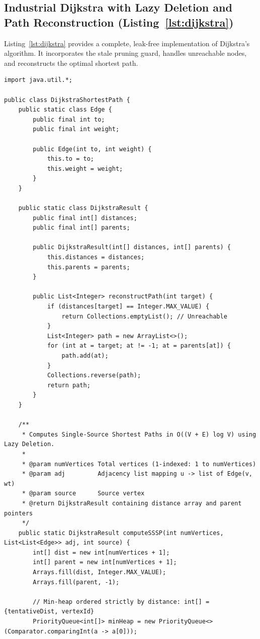 \documentclass[10pt,journal,compsoc,onecolumn]{IEEEtran}
\begin{document}
\subsection{Industrial Dijkstra with Lazy Deletion and Path Reconstruction (Listing~\ref{lst:dijkstra})}
Listing~\ref{lst:dijkstra} provides a complete, leak-free implementation of Dijkstra's algorithm. It incorporates the stale pruning guard, handles unreachable nodes, and reconstructs the optimal shortest path.

\begin{lstlisting}[caption={Production Dijkstra with Lazy Deletion and Path Reconstruction}, label={lst:dijkstra}]
import java.util.*;

public class DijkstraShortestPath {
    public static class Edge {
        public final int to;
        public final int weight;

        public Edge(int to, int weight) {
            this.to = to;
            this.weight = weight;
        }
    }

    public static class DijkstraResult {
        public final int[] distances;
        public final int[] parents;

        public DijkstraResult(int[] distances, int[] parents) {
            this.distances = distances;
            this.parents = parents;
        }

        public List<Integer> reconstructPath(int target) {
            if (distances[target] == Integer.MAX_VALUE) {
                return Collections.emptyList(); // Unreachable
            }
            List<Integer> path = new ArrayList<>();
            for (int at = target; at != -1; at = parents[at]) {
                path.add(at);
            }
            Collections.reverse(path);
            return path;
        }
    }

    /**
     * Computes Single-Source Shortest Paths in O((V + E) log V) using Lazy Deletion.
     *
     * @param numVertices Total vertices (1-indexed: 1 to numVertices)
     * @param adj         Adjacency list mapping u -> list of Edge(v, wt)
     * @param source      Source vertex
     * @return DijkstraResult containing distance array and parent pointers
     */
    public static DijkstraResult computeSSSP(int numVertices, List<List<Edge>> adj, int source) {
        int[] dist = new int[numVertices + 1];
        int[] parent = new int[numVertices + 1];
        Arrays.fill(dist, Integer.MAX_VALUE);
        Arrays.fill(parent, -1);

        // Min-heap ordered strictly by distance: int[] = {tentativeDist, vertexId}
        PriorityQueue<int[]> minHeap = new PriorityQueue<>(Comparator.comparingInt(a -> a[0]));


\end{lstlisting}
\end{document}
